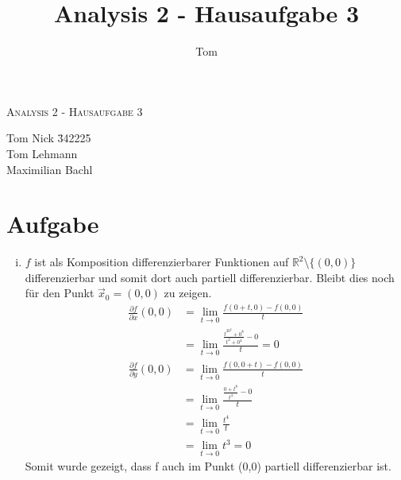 \documentclass[10pt,a4paper,parskip=half]{scrartcl}
\author{Tom}
\title{Analysis 2 - Hausaufgabe 3}
\newcommand{\R}{\mathbb{R}}
\begin{document}
\begin{center}
\textsc{\Large{Analysis 2 - Hausaufgabe 3}} \\
\end{center}
\begin{tabbing}
Tom Nick \hspace{1.4cm}\= 342225\\
Tom Lehmann\\
Maximilian Bachl
\end{tabbing}
\section{Aufgabe}
\begin{enumerate}[(i)]
\item
$f$ ist als Komposition differenzierbarer Funktionen auf $\R^2\setminus{\{(0,0)\}}$ differenzierbar und somit dort auch partiell differenzierbar. Bleibt dies noch für den Punkt $\vec x_0 = (0,0)$ zu zeigen.
\begin{align*}
\frac{\partial f}{\partial x} (0,0)&= \lim_{t \to 0} \frac{f(0+t,0)-f(0,0)}{t}\\
&= \lim_{t \to 0} \frac{\frac{t^20^2+0^8}{t^2+0^4} -0}{t} = 0
\end{align*}
\begin{align*}
\frac{\partial f}{\partial y} (0,0)&= \lim_{t \to 0} \frac{f(0,0+t)-f(0,0)}{t}\\
&= \lim_{t \to 0} \frac{\frac{0+t^8}{t^4} - 0}{t} \\
&= \lim_{t \to 0} \frac{t^4}{t} \\
&= \lim_{t \to 0} t^3 = 0
\end{align*}
Somit wurde gezeigt, dass f auch im Punkt (0,0) partiell differenzierbar ist.


\end{enumerate}
\end{document}
